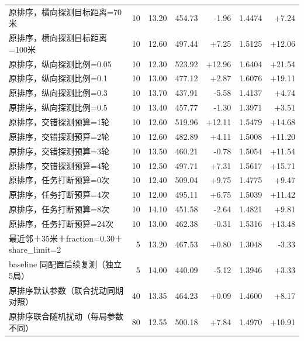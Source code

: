 \begin{longtable}{p{}rrrrrr}
原排序，横向探测目标距离=70米 & 10 & 13.20 & 454.73 & -1.96 & 1.4474 & +7.24 \\
原排序，横向探测目标距离=100米 & 10 & 12.60 & 497.44 & +7.25 & 1.5125 & +12.06 \\
原排序，纵向探测比例=0.05 & 10 & 12.30 & 523.92 & +12.96 & 1.6404 & +21.54 \\
原排序，纵向探测比例=0.1 & 10 & 13.00 & 477.12 & +2.87 & 1.6076 & +19.11 \\
原排序，纵向探测比例=0.3 & 10 & 13.70 & 437.91 & -5.58 & 1.4137 & +4.74 \\
原排序，纵向探测比例=0.5 & 10 & 13.40 & 457.77 & -1.30 & 1.3971 & +3.51 \\
原排序，交错探测预算=1轮 & 10 & 12.60 & 519.96 & +12.11 & 1.5479 & +14.68 \\
原排序，交错探测预算=2轮 & 10 & 12.60 & 482.89 & +4.11 & 1.5008 & +11.20 \\
原排序，交错探测预算=3轮 & 10 & 13.50 & 460.21 & -0.78 & 1.5054 & +11.54 \\
原排序，交错探测预算=4轮 & 10 & 12.50 & 497.71 & +7.31 & 1.5617 & +15.71 \\
原排序，任务打断预算=0次 & 10 & 12.40 & 509.04 & +9.75 & 1.4775 & +9.47 \\
原排序，任务打断预算=4次 & 10 & 12.00 & 495.11 & +6.75 & 1.5039 & +11.42 \\
原排序，任务打断预算=8次 & 10 & 14.10 & 451.58 & -2.64 & 1.4821 & +9.81 \\
原排序，任务打断预算=24次 & 10 & 13.00 & 462.38 & -0.31 & 1.5316 & +13.48 \\
最近邻＋35米＋fraction=0.30＋share\_limit=2 & 5 & 13.20 & 467.53 & +0.80 & 1.3048 & -3.33 \\
baseline 同配置后续复测（独立5局） & 5 & 14.00 & 440.09 & -5.12 & 1.3946 & +3.33 \\
原排序默认参数（联合扰动同期对照） & 40 & 13.35 & 464.23 & +0.09 & 1.4600 & +8.17 \\
原排序联合随机扰动（每局参数不同） & 80 & 12.55 & 500.18 & +7.84 & 1.4970 & +10.91 \\
\end{longtable}\endgroup
